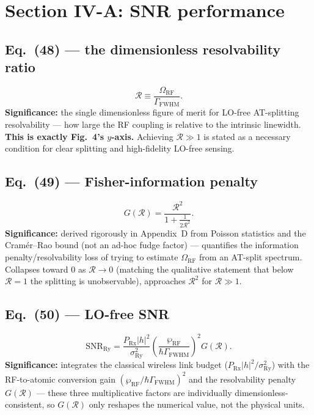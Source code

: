 \documentclass[11pt]{article}
\begin{document}
\section{Section IV-A: SNR performance}

\subsection*{Eq.~(48) --- the dimensionless resolvability ratio}
\begin{equation}
\mathcal R \equiv \frac{\Omega_\text{RF}}{\Gamma_\text{FWHM}}. \tag{48}
\end{equation}
\textbf{Significance:} the single dimensionless figure of merit for
LO-free AT-splitting resolvability --- how large the RF coupling is
relative to the intrinsic linewidth. \textbf{This is exactly Fig.~4's
$y$-axis.} Achieving $\mathcal R\gg1$ is stated as a necessary condition
for clear splitting and high-fidelity LO-free sensing.

\subsection*{Eq.~(49) --- Fisher-information penalty}
\begin{equation}
G(\mathcal R) = \frac{\mathcal R^2}{1+\frac{1}{2\mathcal R^2}}. \tag{49}
\end{equation}
\textbf{Significance:} derived rigorously in Appendix~D from Poisson
statistics and the Cram\'er--Rao bound (not an ad-hoc fudge factor) ---
quantifies the information penalty/resolvability loss of trying to
estimate $\Omega_\text{RF}$ from an AT-split spectrum. Collapses toward
0 as $\mathcal R\to0$ (matching the qualitative statement that below
$\mathcal R=1$ the splitting is unobservable), approaches $\mathcal R^2$
for $\mathcal R\gg1$.

\subsection*{Eq.~(50) --- LO-free SNR}
\begin{equation}
\text{SNR}_\text{Ry} = \frac{P_\text{Rx}|h|^2}{\sigma_\text{Ry}^2}\left(\frac{\wp_\text{RF}}{\hbar\Gamma_\text{FWHM}}\right)^2G(\mathcal R). \tag{50}
\end{equation}
\textbf{Significance:} integrates the classical wireless link budget
($P_\text{Rx}|h|^2/\sigma_\text{Ry}^2$) with the RF-to-atomic conversion
gain $(\wp_\text{RF}/\hbar\Gamma_\text{FWHM})^2$ and the resolvability
penalty $G(\mathcal R)$ --- these three multiplicative factors are
individually dimensionless-consistent, so $G(\mathcal R)$ only reshapes
the numerical value, not the physical units.
\end{document}
